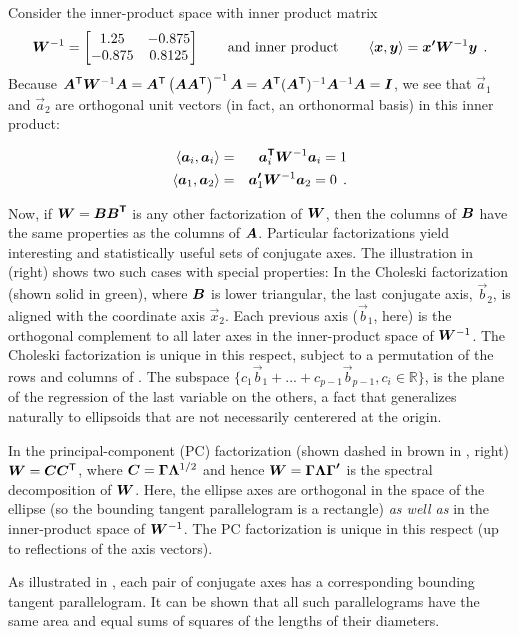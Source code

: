 Consider the inner-product space with inner product matrix 	
\begin{equation*}
\bm{W}^{-1}=\left[ \begin{matrix}	
1.25 & -0.875 \\	
-0.875 & 0.8125 \\	
\end{matrix} \right]
\quad\quad\mbox{and inner product}\quad\quad
\left\langle \bm{x},\bm{y} \right\rangle =\bm{{x}'W}^{-1}\bm{y} \:\: .
\end{equation*} 	
Because	
$\bm{A}^\mathsf{T} \bm{W}^{-1}\bm{A}
=\bm{A}^\mathsf{T}\left( \bm{A}\bm{A}^\mathsf{T} \right)^{-1}\bm{A}
=\bm{A}^\mathsf{T}(\bm{A}^\mathsf{T})^{-1}\bm{A}^{-1}\bm{A}
=\bm{I}
$,
we see that
$\vec{a}_{1}$
and	
$\vec{a}_{2}$	
are orthogonal unit vectors (in fact, an orthonormal basis) in this inner product:	

\begin{eqnarray*}
\left\langle \vec{a}_{i},\vec{a}_{i} \right\rangle & = & \vec{{a}\trans}_{i}\mat{W}^{-1}\vec{a}_{i}=1	 \\
%	
\left\langle \vec{a}_{1},\vec{a}_{2} \right\rangle & = &\vec{{a}'}_{1}\mat{W}^{-1}\vec{a}_{2}=0 \period
\end{eqnarray*}


Now, if $\bm{W}=\bm{B{B}^\mathsf{T}}$ is any other factorization of
$\bm{W}$,
then the columns of
$\bm{B}$
have the same properties as the columns of
$\bm{A}$.
Particular factorizations yield interesting and statistically useful sets of conjugate axes.
The illustration in  (right) shows two such cases with special properties:
In the Choleski factorization (shown solid in green), where
$\bm{B}$ is lower triangular, the last conjugate axis, $\vec{b}_2$, is aligned with the coordinate
axis $\vec{x}_2$.  Each previous axis ($\vec{b}_1$, here) is the orthogonal complement to
all later axes in the  inner-product space of
$\bm{W}^{-1}$.  
The Choleski factorization is unique in this respect, subject to a
permutation of the rows and columns of . 
The subspace $\{ c_1 \vec{b}_1 + ... + c_{p-1} \vec{b}_{p-1}  , c_i \in \mathbb{R}\}$, is the plane of the regression of the last variable on the others, a fact that generalizes naturally to ellipsoids that are not necessarily centerered at the origin.  %

In the principal-component (PC) factorization (shown dashed in brown in , right) $\bm{W}=\bm{C} \bm{C}^\mathsf{T}$, where
$\bm{C}=\bm{\Gamma \Lambda }^{1/2}$
and hence
$\bm{W}=\bm{\Gamma \Lambda {\Gamma }'}$
is the spectral decomposition of
$\bm{W}$. Here, the ellipse axes are orthogonal in the space of the ellipse
(so the bounding tangent parallelogram is a rectangle) \emph{as well as} in the inner-product space of
$\bm{W}^{-1}$. The PC factorization is unique in this respect (up to reflections of the axis vectors).

As illustrated in , each pair of conjugate axes has a corresponding bounding tangent
parallelogram. It can be shown that all such parallelograms have the same area
and equal sums of squares of the lengths of their diameters.
